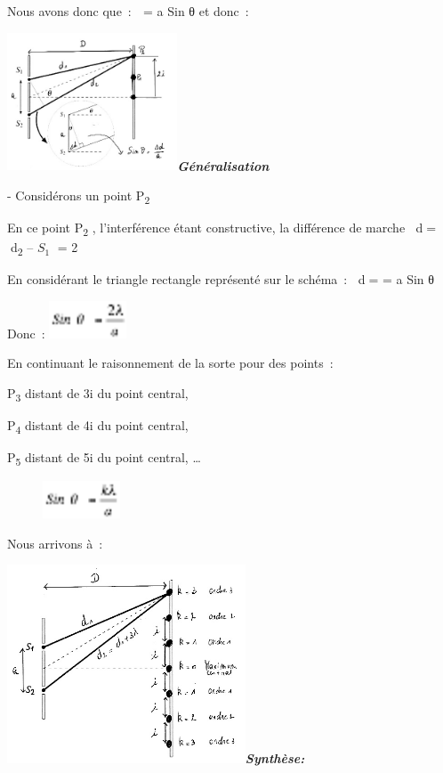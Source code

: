 Nous avons donc que~:  = a Sin θ et donc~:

\includegraphics[width=5.061cm,height=4.096cm]{Pictures/10000001000001D80000017E98931F1CF545D918.png}\emph{\textbf{Généralisation
}}

- Considérons un point P\textsubscript{2}

En ce point P\textsubscript{2 }, l'interférence étant constructive, la
différence de marche d= d\textsubscript{2} -- $S_1$ =
2

En considérant le triangle rectangle représenté sur le schéma~: d= =
a Sin θ

Donc~:
\includegraphics[width=2.306cm,height=1.107cm]{Pictures/100000010000002C000000153ADDDC592928E9B8.png}

En continuant le raisonnement de la sorte pour des points~:

P\textsubscript{3} distant de 3i du point central,

P\textsubscript{4} distant de 4i du point central,

P\textsubscript{5} distant de 5i du point central, \ldots{}

\begin{figure}
\centering
\includegraphics[width=2.306cm,height=1.107cm]{Pictures/100000010000002C0000001558E0CCA95D4F59EB.png}
\caption{}
\end{figure}

Nous arrivons à~:

\includegraphics[width=7.086cm,height=5.897cm]{Pictures/100000010000020C000001B4676C159EC881E6E3.png}\emph{\textbf{Synthèse:}}


